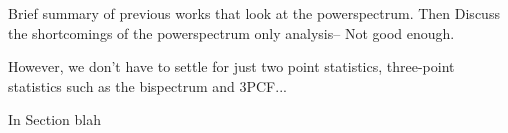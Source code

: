 Brief summary of previous works that look at the powerspectrum.
Then Discuss the 
shortcomings of the powerspectrum only analysis-- Not good enough. 

However, we don't have to settle for just two point statistics, three-point 
statistics such as the bispectrum and 3PCF... 

In Section blah 


